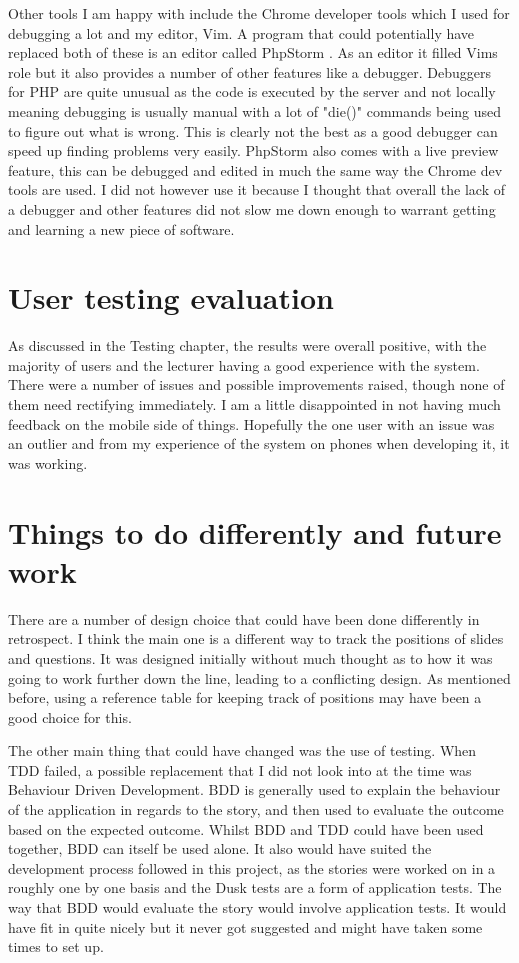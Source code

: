 Other tools I am happy with include the Chrome developer tools which I used for debugging a lot and my editor, Vim. A program that could potentially have replaced both of these is an editor called PhpStorm \cite{phpstorm}. As an editor it filled Vims role but it also provides a number of other features like a debugger. Debuggers for PHP are quite unusual as the code is executed by the server and not locally meaning debugging is usually manual with a lot of "die()" commands being used to figure out what is wrong. This is clearly not the best as a good debugger can speed up finding problems very easily. PhpStorm also comes with a live preview feature, this can be debugged and edited in much the same way the Chrome dev tools are used. I did not however use it because I thought that overall the lack of a debugger and other features did not slow me down enough to warrant getting and learning a new piece of software.

\section{User testing evaluation}
As discussed in the Testing chapter, the results were overall positive, with the majority of users and the lecturer having a good experience with the system. There were a number of issues and possible improvements raised, though none of them need rectifying immediately. I am a little disappointed in not having much feedback on the mobile side of things. Hopefully the one user with an issue was an outlier and from my experience of the system on phones when developing it, it was working.

\section{Things to do differently and future work}
There are a number of design choice that could have been done differently in retrospect. I think the main one is a different way to track the positions of slides and questions. It was designed initially without much thought as to how it was going to work further down the line, leading to a conflicting design. As mentioned before, using a reference table for keeping track of positions may have been a good choice for this.

The other main thing that could have changed was the use of testing. When TDD failed, a possible replacement that I did not look into at the time was Behaviour Driven Development\cite{bdd}. BDD is generally used to explain the behaviour of the application in regards to the story, and then used to evaluate the outcome based on the expected outcome. Whilst BDD and TDD could have been used together, BDD can itself be used alone. It also would have suited the development process followed in this project, as the stories were worked on in a roughly one by one basis and the Dusk tests are a form of application tests. The way that BDD would evaluate the story would involve application tests. It would have fit in quite nicely but it never got suggested and might have taken some times to set up.

